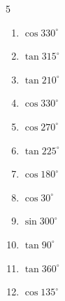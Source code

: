 \begin{multicols}{5}
\begin{enumerate}
        \phantom{$\displaystyle =0$}

  \item $\displaystyle \cos{330^\circ}$


\columnbreak %

\resetques

  \item $\displaystyle \tan{315^\circ}$

        \phantom{$\displaystyle =-1$}

  \item $\displaystyle \tan{210^\circ}$


  \item $\displaystyle \cos{330^\circ}$


  \item $\displaystyle \cos{270^\circ}$

        \phantom{$\displaystyle =0$}

  \item $\displaystyle \tan{225^\circ}$

        \phantom{$\displaystyle =1$}

  \item $\displaystyle \cos{180^\circ}$

        \phantom{$\displaystyle =-1$}

  \item $\displaystyle \cos{30^\circ}$


  \item $\displaystyle \sin{300^\circ}$


  \item $\displaystyle \tan{90^\circ}$

        \phantom{$\displaystyle なし$}

  \item $\displaystyle \tan{360^\circ}$

        \phantom{$\displaystyle =0$}

  \item $\displaystyle \cos{135^\circ}$



\end{enumerate}
\end{multicols}
